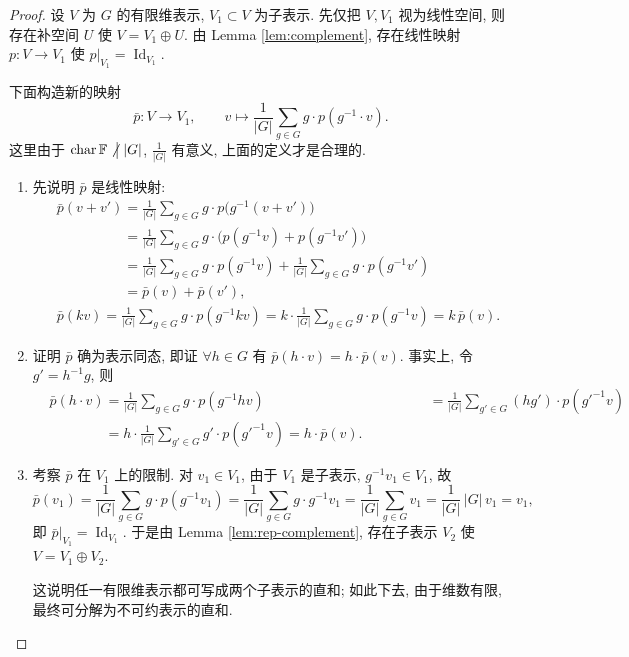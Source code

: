 \begin{proof}
设 $V$ 为 $G$ 的有限维表示, $V_1\subset V$ 为子表示. 先仅把 $V,V_1$ 视为线性空间,
则存在补空间 $U$ 使 $V=V_1\oplus U$. 由 Lemma \ref{lem:complement}, 存在线性映射
$p\colon V\to V_1$ 使 $p|_{V_1}=\operatorname{Id}_{V_1}$.

下面构造新的映射
\begin{equation*}
  \bar p\colon V\longrightarrow V_1,\qquad
  v\longmapsto\frac{1}{|G|}\sum_{g\in G}g\cdot p(g^{-1}\cdot v).
\end{equation*}
这里由于 $\operatorname{char}\mathbb{F}\mathrel{\not\big|}|G|$, $\frac{1}{|G|}$ 有意义, 上面的定义才是合理的.

\begin{enumerate}
\item 先说明 $\bar p$ 是线性映射:
\[\begin{aligned}
  &\bar p(v+v')=\frac{1}{|G|}\sum_{g\in G}g\cdot p\bigl(g^{-1}(v+v')\bigr)\\
  &\phantom{\bar p(v+v')}=\frac{1}{|G|}\sum_{g\in G}g\cdot\bigl(p(g^{-1}v)+p(g^{-1}v')\bigr)\\
  &\phantom{\bar p(v+v')}=\frac{1}{|G|}\sum_{g\in G}g\cdot p(g^{-1}v)
   +\frac{1}{|G|}\sum_{g\in G}g\cdot p(g^{-1}v')\\
  &\phantom{\bar p(v+v')}=\bar p(v)+\bar p(v'),\\
  &\bar p(kv)=\frac{1}{|G|}\sum_{g\in G}g\cdot p(g^{-1}kv)
   =k\cdot\frac{1}{|G|}\sum_{g\in G}g\cdot p(g^{-1}v)=k\,\bar p(v).
\end{aligned}\]

\item 证明 $\bar p$ 确为表示同态, 即证 $\forall h\in G$ 有 $\bar p(h\cdot v)=h\cdot\bar p(v)$.
事实上, 令 $g'=h^{-1}g$, 则
\[\begin{aligned}
  &\bar p(h\cdot v)=\frac{1}{|G|}\sum_{g\in G}g\cdot p(g^{-1}hv)
  &\phantom{\bar p(h\cdot v)}=\frac{1}{|G|}\sum_{g'\in G}(hg')\cdot p(g'^{-1}v)\\
  &\phantom{\bar p(h\cdot v)}=h\cdot\frac{1}{|G|}\sum_{g'\in G}g'\cdot p(g'^{-1}v)=h\cdot\bar p(v).
\end{aligned}\]

\item 考察 $\bar p$ 在 $V_1$ 上的限制. 对 $v_1\in V_1$, 由于 $V_1$ 是子表示, $g^{-1}v_1\in V_1$, 故
\begin{equation*}
  \bar p(v_1)=\frac{1}{|G|}\sum_{g\in G}g\cdot p(g^{-1}v_1)
  =\frac{1}{|G|}\sum_{g\in G}g\cdot g^{-1}v_1
  =\frac{1}{|G|}\sum_{g\in G}v_1=\frac{1}{|G|}\,|G|\,v_1=v_1,
\end{equation*}
即 $\bar p|_{V_1}=\operatorname{Id}_{V_1}$. 于是由 Lemma \ref{lem:rep-complement}, 存在子表示 $V_2$ 使 $V=V_1\oplus V_2$.

这说明任一有限维表示都可写成两个子表示的直和; 如此下去, 由于维数有限, 最终可分解为不可约表示的直和.
\end{enumerate}
\end{proof}

